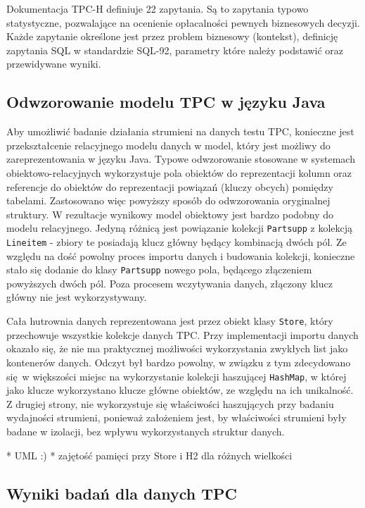 \documentclass[12pt]{extarticle}
\begin{document}
    Dokumentacja TPC-H definiuje 22 zapytania. Są to zapytania typowo statystyczne, pozwalające na ocenienie opłacalności pewnych biznesowych decyzji. Każde zapytanie określone jest przez problem biznesowy (kontekst), definicję zapytania SQL w standardzie SQL-92, parametry które należy podstawić oraz przewidywane wyniki.

\subsection{Odwzorowanie modelu TPC w języku Java}

    Aby umożliwić badanie działania strumieni na danych testu TPC, konieczne jest przekształcenie relacyjnego modelu danych w model, który jest możliwy do zareprezentowania w języku Java. Typowe odwzorowanie stosowane w systemach obiektowo-relacyjnych wykorzystuje pola obiektów do reprezentacji kolumn oraz referencje do obiektów do reprezentacji powiązań (kluczy obcych) pomiędzy tabelami. Zastosowano więc powyższy sposób do odwzorowania oryginalnej struktury. W rezultacje wynikowy model obiektowy jest bardzo podobny do modelu relacyjnego. Jedyną różnicą jest powiązanie kolekcji \texttt{Partsupp} z kolekcją \texttt{Lineitem} - zbiory te posiadają klucz główny będący kombinacją dwóch pól. Ze względu na dość powolny proces importu danych i budowania kolekcji, konieczne stało się dodanie do klasy \texttt{Partsupp} nowego pola, będącego złączeniem powyższych dwóch pól. Poza procesem wczytywania danych, złączony klucz główny nie jest wykorzystywany.

    Cała hutrownia danych reprezentowana jest przez obiekt klasy \texttt{Store}, który przechowuje wszystkie kolekcje danych TPC. Przy implementacji importu danych okazało się, że nie ma praktycznej możliwości wykorzystania zwykłych list jako kontenerów danych. Odczyt był bardzo powolny, w związku z tym zdecydowano się w większości miejsc na wykorzystanie kolekcji haszującej \texttt{HashMap}, w której jako klucze wykorzystano klucze główne obiektów, ze względu na ich unikalność. Z drugiej strony, nie wykorzystuje się właściwości haszujących przy badaniu wydajności strumieni, ponieważ założeniem jest, by właściwości strumieni były badane w izolacji, bez wpływu wykorzystanych struktur danych.

    * UML :)
* zajętość pamięci przy Store i H2 dla różnych wielkości



\subsection{Wyniki badań dla danych TPC}
\end{document}
